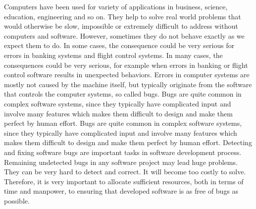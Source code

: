 \label{chapter:verification}

Computers have been used for variety of applications in business, science, education, engineering and so on. They help to solve real world problems that would otherwise be slow, impossible or extremely difficult to address without computers and software. However, sometimes they do not behave exactly as we expect them to do. 
In some cases, the consequence could be very serious for errors in banking systems
and flight control systems.
{In many cases, the consequences could be very serious, for example when errors
in banking or flight control software results in unexpected behaviors.}
Errors in computer systems are mostly not caused by the machine itself, but typically originate from the software that controls the computer systems, so called bugs. 
%
Bugs are quite common  in complex software systems,
since they typically have complicated input and involve many features which makes them difficult to design and make them perfect by human effort.
{Bugs are quite common  in complex software systems,
since they typically have complicated input and involve many features which makes them difficult to design and make them perfect by human effort.}
%
Detecting and fixing software bugs are important tasks in software development process. Remaining undetected bugs in any software project may lead huge
problems. They can be very hard to detect and correct. It will
become too costly to solve.
Therefore, it is very important to allocate sufficient
resources, both in terms of time and manpower, to ensuring that developed
software is as free of bugs as possible.

